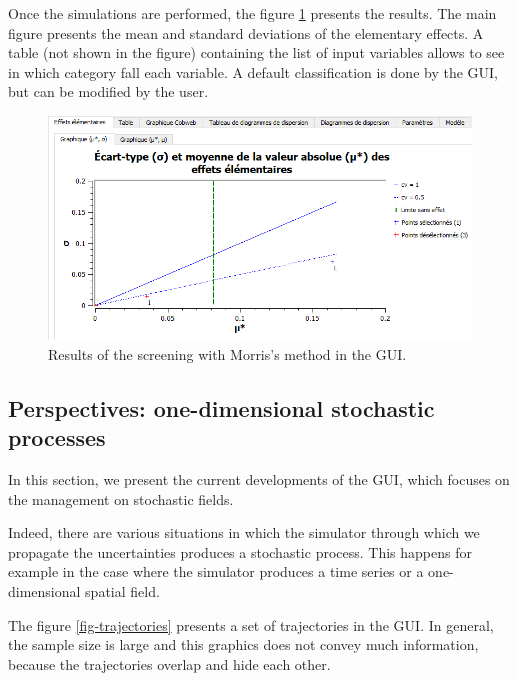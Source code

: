 \documentclass{article}
\begin{document}
Once the simulations are performed, the figure \ref{fig-morrisresultats} presents the results. 
The main figure presents the mean and standard deviations of the elementary effects. 
A table (not shown in the figure) containing the list of input variables allows 
to see in which category fall each variable. 
A default classification is done by the GUI, but can be modified by the user. 

\begin{figure}
\centering
\includegraphics[width=\textwidth]{figures/otgui-criblage-resultat-focus.png}
\caption{Results of the screening with Morris's method in the GUI.}
\label{fig-morrisresultats}
\end{figure}


\subsection{Perspectives: one-dimensional stochastic processes}

In this section, we present the current developments of the GUI, which focuses on the 
management on stochastic fields. 

Indeed, there are various situations in which the simulator through which we propagate the 
uncertainties produces a stochastic process. 
This happens for example in the case where the simulator produces a time series or 
a one-dimensional spatial field. 

The figure \ref{fig-trajectories} presents a set of trajectories in the GUI. 
In general, the sample size is large and this graphics does not convey much information, 
because the trajectories overlap and hide each other. 
\end{document}
